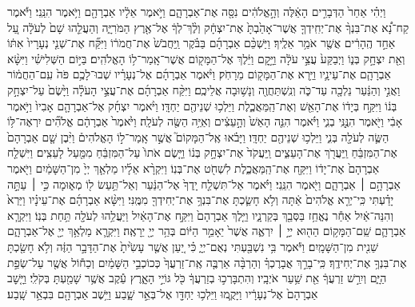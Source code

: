 \documentclass[twoside, openany, parskip=half, 11pt]{book}
\begin{document}
וַיְהִ֗י אַחַר֙ הַדְּבָרִ֣ים הָאֵ֔לֶּה  וְהָ֣אֱלֹהִ֔ים נִסָּ֖ה אֶת־אַבְרָהָ֑ם וַיֹּ֣אמֶר אֵלָ֔יו אַבְרָהָ֖ם וַיֹּ֥אמֶר הִנֵּֽנִי׃ וַיֹּ֡אמֶר קַח־נָ֠א אֶת־בִּנְךָ֨ אֶת־יְחִֽידְךָ֤ אֲשֶׁר־אָהַ֙בְתָּ֙ אֶת־יִצְחָ֔ק וְלֶ֨ךְ־לְךָ֔ אֶל־אֶ֖רֶץ הַמֹּרִיָּ֑ה וְהַעֲלֵ֤הוּ שָׁם֙ לְעֹלָ֔ה עַ֚ל אַחַ֣ד הֶֽהָרִ֔ים אֲשֶׁ֖ר אֹמַ֥ר אֵלֶֽיךָ׃ וַיַּשְׁכֵּ֨ם אַבְרָהָ֜ם בַּבֹּ֗קֶר וַֽיַּחֲבֹשׁ֙ אֶת־חֲמֹר֔וֹ וַיִּקַּ֞ח אֶת־שְׁנֵ֤י נְעָרָיו֙ אִתּ֔וֹ וְאֵ֖ת יִצְחָ֣ק בְּנ֑וֹ וַיְבַקַּע֙ עֲצֵ֣י עֹלָ֔ה וַיָּ֣קׇם וַיֵּ֔לֶךְ אֶל־הַמָּק֖וֹם אֲשֶׁר־אָֽמַר־ל֥וֹ הָאֱלֹהִֽים׃ בַּיּ֣וֹם הַשְּׁלִישִׁ֗י וַיִּשָּׂ֨א אַבְרָהָ֧ם אֶת־עֵינָ֛יו וַיַּ֥רְא אֶת־הַמָּק֖וֹם מֵרָחֹֽק׃ וַיֹּ֨אמֶר אַבְרָהָ֜ם אֶל־נְעָרָ֗יו שְׁבוּ־לָכֶ֥ם פֹּה֙ עִֽם־הַחֲמ֔וֹר וַאֲנִ֣י וְהַנַּ֔עַר נֵלְכָ֖ה עַד־כֹּ֑ה וְנִֽשְׁתַּחֲוֶ֖ה וְנָשׁ֥וּבָה אֲלֵיכֶֽם׃ וַיִּקַּ֨ח אַבְרָהָ֜ם אֶת־עֲצֵ֣י הָעֹלָ֗ה וַיָּ֙שֶׂם֙ עַל־יִצְחָ֣ק בְּנ֔וֹ וַיִּקַּ֣ח בְּיָד֔וֹ אֶת־הָאֵ֖שׁ וְאֶת־הַֽמַּאֲכֶ֑לֶת וַיֵּלְכ֥וּ שְׁנֵיהֶ֖ם יַחְדָּֽו׃ וַיֹּ֨אמֶר יִצְחָ֜ק אֶל־אַבְרָהָ֤ם אָבִיו֙ וַיֹּ֣אמֶר אָבִ֔י וַיֹּ֖אמֶר הִנֶּ֣נִּֽי בְנִ֑י וַיֹּ֗אמֶר הִנֵּ֤ה הָאֵשׁ֙ וְהָ֣עֵצִ֔ים וְאַיֵּ֥ה הַשֶּׂ֖ה לְעֹלָֽה׃ וַיֹּ֙אמֶר֙ אַבְרָהָ֔ם אֱלֹהִ֞ים יִרְאֶה־לּ֥וֹ הַשֶּׂ֛ה לְעֹלָ֖ה בְּנִ֑י וַיֵּלְכ֥וּ שְׁנֵיהֶ֖ם יַחְדָּֽו׃ וַיָּבֹ֗אוּ אֶֽל־הַמָּקוֹם֮ אֲשֶׁ֣ר אָֽמַר־ל֣וֹ הָאֱלֹהִים֒ וַיִּ֨בֶן שָׁ֤ם אַבְרָהָם֙ אֶת־הַמִּזְבֵּ֔חַ וַֽיַּעֲרֹ֖ךְ אֶת־הָעֵצִ֑ים וַֽיַּעֲקֹד֙ אֶת־יִצְחָ֣ק בְּנ֔וֹ וַיָּ֤שֶׂם אֹתוֹ֙ עַל־הַמִּזְבֵּ֔חַ מִמַּ֖עַל לָעֵצִֽים׃ וַיִּשְׁלַ֤ח אַבְרָהָם֙ אֶת־יָד֔וֹ וַיִּקַּ֖ח אֶת־הַֽמַּאֲכֶ֑לֶת לִשְׁחֹ֖ט אֶת־בְּנֽוֹ׃ וַיִּקְרָ֨א אֵלָ֜יו מַלְאַ֤ךְ יְיָ֙ מִן־הַשָּׁמַ֔יִם וַיֹּ֖אמֶר אַבְרָהָ֣ם ׀ אַבְרָהָ֑ם וַיֹּ֖אמֶר הִנֵּֽנִי׃ וַיֹּ֗אמֶר אַל־תִּשְׁלַ֤ח יָֽדְךָ֙ אֶל־הַנַּ֔עַר וְאַל־תַּ֥עַשׂ ל֖וֹ מְא֑וּמָה כִּ֣י ׀ עַתָּ֣ה יָדַ֗עְתִּי כִּֽי־יְרֵ֤א אֱלֹהִים֙ אַ֔תָּה וְלֹ֥א חָשַׂ֛כְתָּ אֶת־בִּנְךָ֥ אֶת־יְחִידְךָ֖ מִמֶּֽנִּי׃ וַיִּשָּׂ֨א אַבְרָהָ֜ם אֶת־עֵינָ֗יו וַיַּרְא֙ וְהִנֵּה־אַ֔יִל אַחַ֕ר נֶאֱחַ֥ז בַּסְּבַ֖ךְ בְּקַרְנָ֑יו וַיֵּ֤לֶךְ אַבְרָהָם֙ וַיִּקַּ֣ח אֶת־הָאַ֔יִל וַיַּעֲלֵ֥הוּ לְעֹלָ֖ה תַּ֥חַת בְּנֽוֹ׃ וַיִּקְרָ֧א אַבְרָהָ֛ם שֵֽׁם־הַמָּק֥וֹם הַה֖וּא יְיָ֣ ׀ יִרְאֶ֑ה אֲשֶׁר֙ יֵאָמֵ֣ר הַיּ֔וֹם בְּהַ֥ר יְיָ֖ יֵרָאֶֽה׃ וַיִּקְרָ֛א מַלְאַ֥ךְ יְיָ֖ אֶל־אַבְרָהָ֑ם שֵׁנִ֖ית מִן־הַשָּׁמָֽיִם׃ וַיֹּ֕אמֶר בִּ֥י נִשְׁבַּ֖עְתִּי נְאֻם־יְיָ֑ כִּ֗י יַ֚עַן אֲשֶׁ֤ר עָשִׂ֙יתָ֙ אֶת־הַדָּבָ֣ר הַזֶּ֔ה וְלֹ֥א חָשַׂ֖כְתָּ אֶת־בִּנְךָ֥ אֶת־יְחִידֶֽךָ׃ כִּֽי־בָרֵ֣ךְ אֲבָרֶכְךָ֗ וְהַרְבָּ֨ה אַרְבֶּ֤ה אֶֽת־זַרְעֲךָ֙ כְּכוֹכְבֵ֣י הַשָּׁמַ֔יִם וְכַח֕וֹל אֲשֶׁ֖ר עַל־שְׂפַ֣ת הַיָּ֑ם וְיִרַ֣שׁ זַרְעֲךָ֔ אֵ֖ת שַׁ֥עַר אֹיְבָֽיו׃ וְהִתְבָּרְכ֣וּ בְזַרְעֲךָ֔ כֹּ֖ל גּוֹיֵ֣י הָאָ֑רֶץ עֵ֕קֶב אֲשֶׁ֥ר שָׁמַ֖עְתָּ בְּקֹלִֽי׃ וַיָּ֤שׇׁב אַבְרָהָם֙ אֶל־נְעָרָ֔יו וַיָּקֻ֛מוּ וַיֵּלְכ֥וּ יַחְדָּ֖ו אֶל־בְּאֵ֣ר שָׁ֑בַע וַיֵּ֥שֶׁב אַבְרָהָ֖ם בִּבְאֵ֥ר שָֽׁבַע׃
\end{document}
